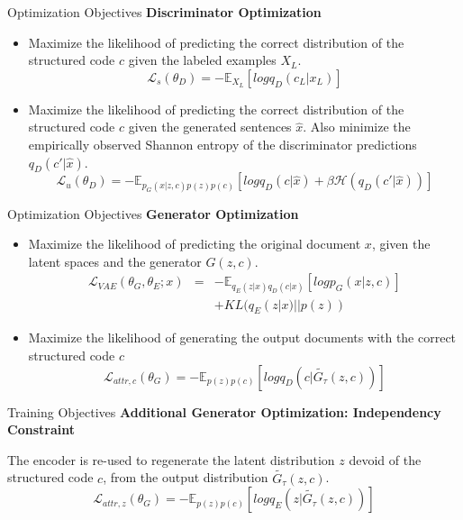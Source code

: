 \documentclass{beamer}
\begin{document}
\begin{frame}{Optimization Objectives}
	\textbf{Discriminator Optimization}

	\begin{itemize}
		\item Maximize the likelihood of predicting the correct distribution of the structured code $c$ given the labeled examples $X_L$.
		      \begin{equation*}
			      \mathcal{L}_s(\theta_D) = - \mathbb{E}_{X_L}[log q_D(c_L|x_L)]
		      \end{equation*}
		\item Maximize the likelihood of predicting the correct distribution of the structured code $c$ given the generated sentences $\hat{x}$. Also minimize the empirically observed Shannon entropy of the discriminator predictions $q_D(c'|\hat{x})$.
		      \begin{equation*}
			      \mathcal{L}_u(\theta_D) = - \mathbb{E}_{p_G(\hat{x}|z,c)p(z)p(c)}
			      [log q_D(c|\hat{x}) + \beta \mathcal{H}(q_D(c'|\hat{x}))]
		      \end{equation*}
	\end{itemize}
\end{frame}

\begin{frame}{Optimization Objectives}
	\textbf{Generator Optimization}

	\begin{itemize}
		\item Maximize the likelihood of predicting the original document $x$, given the latent spaces and the generator $G(z,c)$.
		      \begin{eqnarray*}
			      \mathcal{L}_{VAE}(\theta_G, \theta_E; x) &=&
			      - \mathbb{E}_{q_E(z|x)q_D(c|x)}[log p_G(x|z,c)] \\ & &
			      + KL(q_E(z|x)||p(z))
		      \end{eqnarray*}
		\item Maximize the likelihood of generating the output documents with the correct structured code $c$
		      \begin{equation*}
			      \mathcal{L}_{attr, c}(\theta_G) = - \mathbb{E}_{p(z)p(c)}
			      [log q_D(c|\tilde{G_{\tau}}(z,c))]
		      \end{equation*}
	\end{itemize}
\end{frame}

\begin{frame}{Training Objectives}
	\textbf{Additional Generator Optimization: Independency Constraint}

	The encoder is re-used to regenerate the latent distribution $z$ devoid of the structured code $c$, from the output distribution $\tilde{G_{\tau}}(z,c)$.
	\begin{equation*}
		\mathcal{L}_{attr, z}(\theta_G) = - \mathbb{E}_{p(z)p(c)}
		[log q_E(z|\tilde{G_{\tau}}(z,c))]
	\end{equation*}
\end{frame}
\end{document}
